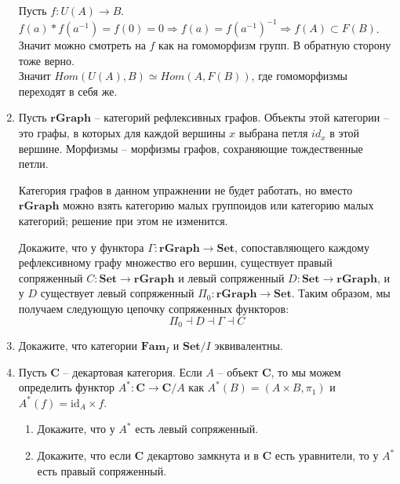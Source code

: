 \documentclass[draft]{article}
\newcommand{\cat}[1]{\mathbf{#1}}
\renewcommand{\C}{\cat{C}}
\newcommand{\Set}{\cat{Set}}
\newcommand{\fs}[1]{\mathrm{#1}}
\newcommand{\id}{\fs{id}}
\begin{document}
\begin{enumerate}
Пусть $f: U(A) \to B$. $f(a) * f(a^{-1}) = f(0) = 0 \Rightarrow f(a) = f(a^{-1})^{-1} \Rightarrow f(A) \subset F(B)$. Значит можно смотреть на $f$ как на гомоморфизм групп. В обратную сторону тоже верно. \\
Значит $Hom(U(A), B) \simeq Hom(A, F(B))$, где гомоморфизмы переходят в себя же.


\item Пусть $\cat{rGraph}$ -- категорий рефлексивных графов.
Объекты этой категории -- это графы, в которых для каждой вершины $x$ выбрана петля $id_x$ в этой вершине.
Морфизмы -- морфизмы графов, сохраняющие тождественные петли.

Категория графов в данном упражнении не будет работать, но вместо $\cat{rGraph}$ можно взять категорию малых группоидов или категорию малых категорий; решение при этом не изменится.

Докажите, что у функтора $\Gamma : \cat{rGraph} \to \Set$, сопоставляющего каждому рефлексивному графу множество его вершин, существует правый сопряженный $C : \Set \to \cat{rGraph}$ и левый сопряженный $D : \Set \to \cat{rGraph}$,
и у $D$ существует левый сопряженный $\Pi_0 : \cat{rGraph} \to \Set$.
Таким образом, мы получаем следующую цепочку сопряженных функторов:
\[ \Pi_0 \dashv D \dashv \Gamma \dashv C \]

\item Докажите, что категории $\cat{Fam}_I$ и $\Set/I$ эквивалентны.

\item Пусть $\C$ -- декартовая категория.
Если $A$ -- объект $\C$, то мы можем определить функтор $A^* : \C \to \C/A$ как $A^*(B) = (A \times B, \pi_1)$ и $A^*(f) = \id_A \times f$.
\begin{enumerate}
\item Докажите, что у $A^*$ есть левый сопряженный.
\item Докажите, что если $\C$ декартово замкнута и в $\C$ есть уравнители, то у $A^*$ есть правый сопряженный.
\end{enumerate}
\end{enumerate}
\end{document}
